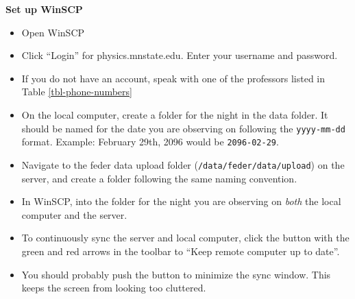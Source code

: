 \documentclass[letterpaper, 12pt]{report}
\begin{document}
\large{\textbf{Set up WinSCP}}
\begin{itemize}
	\item Open WinSCP
	\item Click ``Login'' for physics.mnstate.edu. Enter your username and password.
	\item If you do not have an account, speak with one of the professors listed in Table \ref{tbl-phone-numbers}
	\item On the local computer, create a folder for the night in the data folder. It should be named for the date you are observing on following the \texttt{yyyy-mm-dd} format. Example: February 29th, 2096 would be \texttt{2096-02-29}.
	\item Navigate to the feder data upload folder (\texttt{/data/feder/data/upload}) on the server, and create a folder following the same naming convention.
	\item In WinSCP,  into the folder for the night you are observing on \emph{both} the local computer and the server.
	\item To continuously sync the server and local computer, click the button with the green and red arrows in the toolbar to ``Keep remote computer up to date''.
	\item You should probably push the button to minimize the sync window. This keeps the screen from looking too cluttered.
\end{itemize}


\newpage
\end{document}

